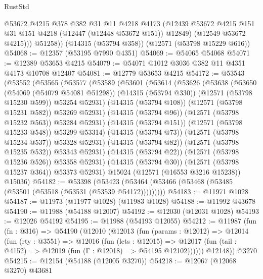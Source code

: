 \begin{lexlean}{RustStd}
\begin{coremodule}
            @53672
            @4215
            @378
            @382
            @31
            @11
            @4218
            @4173
            (@12439 @53672 @4215 @151 @31 @151 @4218 (@12447 (@12448 @53672 @151)) @12849)
            (@12549 @53672 @4215)))
        @51258))
    (@14315 (@53794 @358))
    (@12571 (@53798 @15229 @616))
@54068 := @12357 (@53195 @7990 @4351)
@54069 := @54065 @54068
@54071 := @12389 @53653 @4215
@54079 := @54071 @1012 @3036 @382 @11 @4351 @4173 @10708 @12407
@54081 := @12779 @53653 @4215
@54172 := @53543
    (@53552
      (@53565
        (@53577
          (@53589
            (@53601
              (@53614
                (@53626
                  (@53638
                    (@53650
                      (@54069 (@54079 @54081 @51298))
                      (@14315 (@53794 @330))
                      (@12571 (@53798 @15230 @599))
                      @53254
                      @52931)
                    (@14315 (@53794 @108))
                    (@12571 (@53798 @15231 @582))
                    @53269
                    @52931)
                  (@14315 (@53794 @96))
                  (@12571 (@53798 @15232 @563))
                  @53284
                  @52931)
                (@14315 (@53794 @151))
                (@12571 (@53798 @15233 @548))
                @53299
                @53314)
              (@14315 (@53794 @73))
              (@12571 (@53798 @15234 @537))
              @53328
              @52931)
            (@14315 (@53794 @82))
            (@12571 (@53798 @15235 @532))
            @53343
            @52931)
          (@14315 (@53794 @22))
          (@12571 (@53798 @15236 @526))
          @53358
          @52931)
        (@14315 (@53794 @30))
        (@12571 (@53798 @15237 @364))
        @53373
        @52931)
      @15024
      (@12571 (@16553 @3216 @15238))
      @15036)
@54182 := @53398
    (@53423 (@53464 (@53466 (@53468 (@53485 (@53501 (@53518 (@53531 (@53539 @54172)))))))))
@54183 := @11971 @1028
@54187 := @11973 (@11977 @1028) (@11983 @1028)
@54188 := @11992 @43678
@54190 := @11988 (@54188 @12007)
@54192 := @12030 (@12031 @1028)
@54193 := @12026 @54192
@54195 := @11988 (@54193 @12055)
@54212 := @11987
    (fun (fn : @316) =>
    @54190
      (@12010
        (@12013
          (fun (params : @12012) =>
          @12014
            (fun (rty : @3551) =>
            @12016
              (fun (lets : @12015) =>
              @12017 (fun (tail : @4152) => @12019 (fun (Γ : @12018) => @54195 @12102))))))
        @12148))
    @3270
@54215 := @12154 (@54188 (@12005 @3270))
@54218 := @12067 (@12068 @3270) @43681

\end{coremodule}
\end{lexlean}

